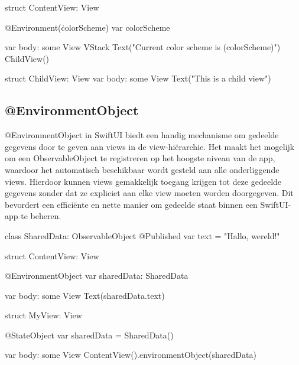 \begin{swift}[caption=Example of Environment, label=Environment_example]
struct ContentView: View {
    @Environment(\.colorScheme) var colorScheme
    
    var body: some View {
        VStack {
            Text("Current color scheme is (colorScheme)")
            ChildView()
        }
    }
}

struct ChildView: View {
    var body: some View {
        Text("This is a child view")
    }
}
\end{swift}

\subsection{@EnvironmentObject}
\autocite{AppleEnvironmentObject} @EnvironmentObject in SwiftUI biedt een handig mechanisme om gedeelde gegevens door te geven aan views in de view-hiërarchie. Het maakt het mogelijk om een ObservableObject te registreren op het hoogste niveau van de app, waardoor het automatisch beschikbaar wordt gesteld aan alle onderliggende views. Hierdoor kunnen views gemakkelijk toegang krijgen tot deze gedeelde gegevens zonder dat ze expliciet aan elke view moeten worden doorgegeven. Dit bevordert een efficiënte en nette manier om gedeelde staat binnen een SwiftUI-app te beheren.


\begin{swift}[caption=Example of EnvironmentObject, label=EnvironmentObject_example]
    class SharedData: ObservableObject {
        @Published var text = "Hallo, wereld!"
    }
    
    struct ContentView: View {
        @EnvironmentObject var sharedData: SharedData
        
        var body: some View {
            Text(sharedData.text)
        }
    }

    struct MyView: View {
        @StateObject var sharedData = SharedData()
        
        var body: some View {
            ContentView().environmentObject(sharedData)
        }
    }
\end{swift}

